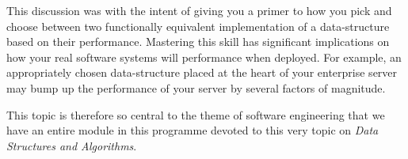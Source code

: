 \documentclass[12pt,a4paper]{article}
\begin{document}
This discussion was with the intent of giving you a primer to how you pick and choose between two functionally equivalent implementation of a data-structure based on their performance. Mastering this skill has significant implications on how your real software systems will performance when deployed. For example, an appropriately chosen data-structure placed at the heart of your enterprise server may bump up the performance of your server by several factors of magnitude.

This topic is therefore so central to the theme of software engineering that we have an entire module in this programme devoted to this very topic on \emph{Data Structures and Algorithms}.
\end{document}

